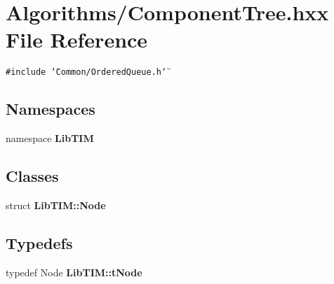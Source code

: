 \section{Algorithms/Component\-Tree.hxx File Reference}
\label{ComponentTree_8hxx}
{\tt \#include \char`\"{}Common/Ordered\-Queue.h\char`\"{}}\par
\subsection*{Namespaces}
\begin{CompactItemize}
\item 
namespace {\bf Lib\-TIM}
\end{CompactItemize}
\subsection*{Classes}
\begin{CompactItemize}
\item 
struct {\bf Lib\-TIM::Node}
\end{CompactItemize}
\subsection*{Typedefs}
\begin{CompactItemize}
\item 
typedef Node {\bf Lib\-TIM::t\-Node}
\end{CompactItemize}

